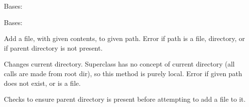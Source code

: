 \documentclass[letterpaper,12pt,openany,oneside]{sphinxmanual}
\begin{document}
\begin{fulllineitems}
\label{File_System:covertFS.File_System.covertfs.CovertEntry}
Bases: 

\end{fulllineitems}


\begin{fulllineitems}
\label{File_System:covertFS.File_System.covertfs.CovertFS}
Bases: 

\begin{fulllineitems}
\label{File_System:covertFS.File_System.covertfs.CovertFS.addfile}
Add a file, with given contents, to given path.
Error if path is a file, directory, or if parent directory
is not present.

\end{fulllineitems}


\begin{fulllineitems}
\label{File_System:covertFS.File_System.covertfs.CovertFS.cd}
Changes current directory. Superclass has no concept of
current directory (all calls are made from root dir), so
this method is purely local.
Error if given path does not exist, or is a file.

\end{fulllineitems}


\begin{fulllineitems}
\label{File_System:covertFS.File_System.covertfs.CovertFS.check_parent_dir}
Checks to ensure parent directory is present before
attempting to add a file to it.

\end{fulllineitems}


\end{fulllineitems}
\end{document}
